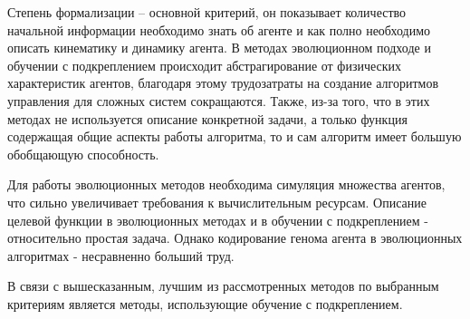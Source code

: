 Степень формализации -- основной критерий, он показывает количество начальной информации необходимо знать об агенте и как полно необходимо описать кинематику и динамику агента. 
В методах эволюционном подходе и обучении с подкреплением происходит абстрагирование от физических характеристик агентов, благодаря этому трудозатраты на создание алгоритмов управления для сложных систем сокращаются. 
Также, из-за того, что в этих методах не используется описание конкретной задачи, а только функция содержащая общие аспекты работы алгоритма, то и сам алгоритм имеет большую обобщающую способность.

Для работы эволюционных методов необходима симуляция множества агентов, что сильно увеличивает требования к вычислительным ресурсам. 
Описание целевой функции в эволюционных методах и в обучении с подкреплением - относительно простая задача. Однако кодирование генома агента в эволюционных алгоритмах - несравненно больший труд.

В связи с вышесказанным, лучшим из рассмотренных методов по выбранным критериям является методы, использующие обучение с подкреплением.

\clearpage

